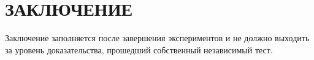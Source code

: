 \chapter*{ЗАКЛЮЧЕНИЕ}

Заключение заполняется после завершения экспериментов и не должно выходить за уровень
доказательства, прошедший собственный независимый тест.
